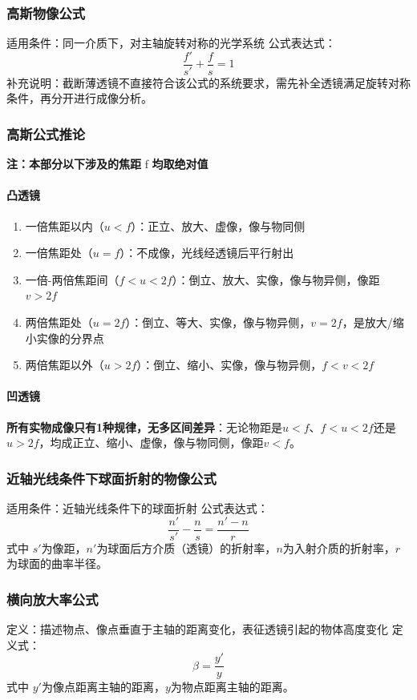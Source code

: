 \documentclass{article}
\begin{document}
	\subsubsection{高斯物像公式}
	适用条件：同一介质下，对主轴旋转对称的光学系统
	公式表达式：
	\[
	\frac{f'}{s'}+\frac{f}{s}=1
	\]
	补充说明：截断薄透镜不直接符合该公式的系统要求，需先补全透镜满足旋转对称条件，再分开进行成像分析。
	
	\subsubsection{高斯公式推论}
	\textbf{注：本部分以下涉及的焦距 }f\textbf{ 均取绝对值}
	
	\paragraph{凸透镜}
	\begin{enumerate}[label=\arabic*., leftmargin=2em, itemsep=0.5em]
		\item 一倍焦距以内（$u<f$）：正立、放大、虚像，像与物同侧
		\item 一倍焦距处（$u=f$）：不成像，光线经透镜后平行射出
		\item 一倍-两倍焦距间（$f<u<2f$）：倒立、放大、实像，像与物异侧，像距$v>2f$
		\item 两倍焦距处（$u=2f$）：倒立、等大、实像，像与物异侧，$v=2f$，是放大/缩小实像的分界点
		\item 两倍焦距以外（$u>2f$）：倒立、缩小、实像，像与物异侧，$f<v<2f$
	\end{enumerate}
	
	\paragraph{凹透镜}
	
	\textbf{所有实物成像只有1种规律，无多区间差异}：无论物距是$u<f$、$f<u<2f$还是$u>2f$，均成正立、缩小、虚像，像与物同侧，像距$v<f$。
	

	\subsubsection{近轴光线条件下球面折射的物像公式}
	适用条件：近轴光线条件下的球面折射
	公式表达式：
	\[
	\frac{n'}{s'}-\frac{n}{s}=\frac{n'-n}{r}
	\]
	式中 $s'$为像距，$n'$为球面后方介质（透镜）的折射率，$n$为入射介质的折射率，$r$为球面的曲率半径。
	
	\subsubsection{横向放大率公式}
	定义：描述物点、像点垂直于主轴的距离变化，表征透镜引起的物体高度变化
	定义式：
	\[
	\beta=\frac{y'}{y}
	\]
	式中 $y'$为像点距离主轴的距离，$y$为物点距离主轴的距离。
	
\end{document}
